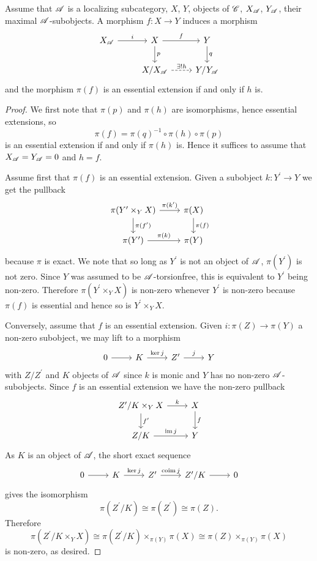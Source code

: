 \documentclass[dissertation.tex]{subfiles}
\begin{document}
\begin{lem}\label{lem5}
  Assume that $\mathscr{A}$ is a localizing subcategory, $X$, $Y$, objects of $\mathscr{C}$, $X_{\mathscr{A}}$, $Y_{\mathscr{A}}$, their maximal $\mathscr{A}$-subobjects.
  A morphism $f \colon X \rightarrow Y$ induces a morphism
  $$\begin{tikzcd}
    X_\A \arrow{r}{i} & X \arrow{r}{f}\arrow{d}{p} & Y\arrow{d}{q}\\
    & X/X_\A \arrow[dashed]{r}{\exists !h} & Y/Y_\A
  \end{tikzcd}$$
  and the morphism $\pi(f)$ is an essential extension if and only if $h$ is.

  \begin{proof}
    We first note that $\pi(p)$ and $\pi(h)$ are isomorphisms, hence essential extensions, so 
    $$\pi(f) = \pi(q)^{-1} \circ \pi(h) \circ \pi(p)$$
    is an essential extension if and only if $\pi(h)$ is.
    Hence it suffices to assume that $X_{\mathscr{A}} = Y_{\mathscr{A}} = 0$ and $h = f$.
    
    Assume first that $\pi(f)$ is an essential extension.
    Given a subobject $k : Y^\prime \rightarrow Y$ we get the pullback 
    $$\begin{tikzcd}
      \pi(Y^\prime \times_Y X) \arrow{r}{\pi(k^\prime)}\arrow{d}{\pi(f^\prime)} & \pi(X) \arrow{d}{\pi(f)}\\
      \pi(Y^\prime) \arrow{r}{\pi(k)} &\pi(Y)
    \end{tikzcd}$$
    because $\pi$ is exact.
    We note that so long as $Y^\prime$ is not an object of $\mathscr{A}$, $\pi(Y^\prime)$ is not zero.
    Since $Y$ was assumed to be $\mathscr{A}$-torsionfree, this is equivalent to $Y^\prime$ being non-zero.
    Therefore $\pi(Y^\prime \times_Y X)$ is non-zero whenever $Y^\prime$ is non-zero because $\pi(f)$ is essential and hence so is $Y^\prime \times_Y X$.
    
    Conversely, assume that $f$ is an essential extension.
    Given $i : \pi(Z) \rightarrow \pi(Y)$ a non-zero subobject, we may lift to a morphism 
    $$\begin{tikzcd}
      0 \arrow{r} & K \arrow{r}{\ker{j}} & Z^\prime \arrow{r}{j} & Y
    \end{tikzcd}$$
    with $Z/Z^\prime$ and $K$ objects of $\mathscr{A}$ since $k$ is monic and $Y$ has no non-zero $\mathscr{A}$-subobjects.
    Since $f$ is an essential extension we have the non-zero pullback
    $$\begin{tikzcd}
      Z^\prime / K \times_Y X \arrow{r}{k}\arrow{d}{f^\prime} & X\arrow{d}{f} \\
      Z/K \arrow{r}{\im{j}}& Y
    \end{tikzcd}$$
    As $K$ is an object of $\mathscr{A}$, the short exact sequence
    $$\begin{tikzcd}
      0 \arrow{r} & K \arrow{r}{\ker{j}} & Z^\prime \arrow{r}{\coim{j}} & Z^\prime/K \arrow{r} & 0
    \end{tikzcd}$$
    gives the isomorphism
    $$\pi(Z^\prime/K) \cong \pi(Z^\prime) \cong \pi(Z).$$
    Therefore
    $$\pi(Z^\prime/K \times_Y X) \cong \pi(Z^\prime/K) \times_{\pi(Y)} \pi(X) \cong \pi(Z) \times_{\pi(Y)} \pi(X)$$
    is non-zero, as desired.
  \end{proof}
\end{lem}
\end{document}

